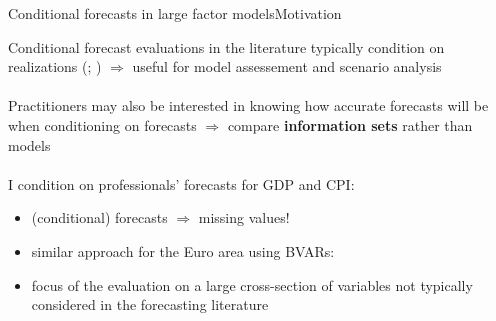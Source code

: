 \documentclass[xcolor=svgnames, 10pt, aspectratio=169]{beamer}
\begin{document}
\begin{frame}{Conditional forecasts in large factor models}{Motivation}
    
    Conditional forecast evaluations in the literature typically condition on realizations (\citealp[][\scriptsize \textbf{JAE}\normalsize]{clarkmccracken_2017_jae}; \citealp[][\scriptsize \textbf{IJoF}\normalsize]{bgl_2015ijf}) $\Longrightarrow$ useful for model assessement and scenario analysis \\~\\  

    Practitioners may also be interested in knowing how accurate forecasts will be when conditioning on forecasts $\Longrightarrow$ compare \textbf{information sets} rather than models \\~\\  

    I condition on professionals' forecasts for GDP and CPI:
    \vspace{0.2cm}
    \begin{itemize}
        \item (conditional) forecasts $\Longrightarrow$  missing values!
        \item similar approach for the Euro area using BVARs: \citet[][\scriptsize \textbf{IJoF}\normalsize]{ganicsodendahl_2021_ijf}
        \item focus of the evaluation on a large cross-section of variables not typically considered in the forecasting literature 
    \end{itemize}    
    
      
\end{frame}
\end{document}
